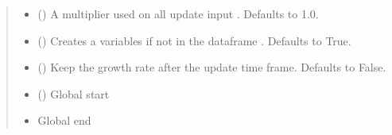 \documentclass[letterpaper,10pt,english]{sphinxmanual}
\begin{document}
\begin{fulllineitems}
\begin{fulllineitems}
\begin{quote}
\begin{description}
\begin{itemize}
\item {} 
\sphinxAtStartPar
{} (\sphinxstyleliteralemphasis{\sphinxupquote{, }}) \textendash{} A multiplier used on all update input . Defaults to 1.0.

\item {} 
\sphinxAtStartPar
{} (\sphinxstyleliteralemphasis{\sphinxupquote{, }}) \textendash{} Creates a variables if not in the dataframe . Defaults to True.

\item {} 
\sphinxAtStartPar
{} (\sphinxstyleliteralemphasis{\sphinxupquote{, }}) \textendash{} Keep the growth rate after the update time frame. Defaults to False.

\item {} 
\sphinxAtStartPar
{} (\sphinxstyleliteralemphasis{\sphinxupquote{, }}) \textendash{} Global start

\item {} 
\sphinxAtStartPar
{} \textendash{} Global end

\end{itemize}

\end{description}\end{quote}

\end{fulllineitems}


\begin{fulllineitems}
\label{\detokenize{index:modelclass.Model_help_Mixin.update}}
\pysigstartsignatures
{}
\pysigstopsignatures\begin{quote}


\end{quote}
\end{fulllineitems}
\end{fulllineitems}
\end{document}
